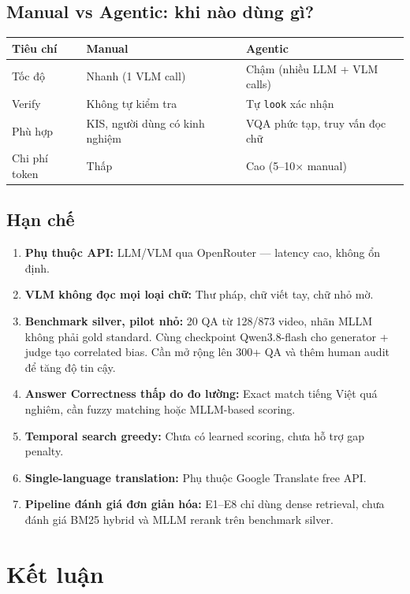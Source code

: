 \documentclass[12pt,a4paper,onecolumn]{article}
\begin{document}
\subsection{Manual vs Agentic: khi nào dùng gì?}

\begin{center}
\begin{tabular}{l l l}
\toprule
Tiêu chí & Manual & Agentic \\
\midrule
Tốc độ & Nhanh (1 VLM call) & Chậm (nhiều LLM + VLM calls) \\
Verify & Không tự kiểm tra & Tự \texttt{look} xác nhận \\
Phù hợp & KIS, người dùng có kinh nghiệm & VQA phức tạp, truy vấn đọc chữ \\
Chi phí token & Thấp & Cao (5–10× manual) \\
\bottomrule
\end{tabular}
\end{center}


\subsection{Hạn chế}

\begin{enumerate}
  \item \textbf{Phụ thuộc API:} LLM/VLM qua OpenRouter — latency cao, không ổn định.
  \item \textbf{VLM không đọc mọi loại chữ:} Thư pháp, chữ viết tay, chữ nhỏ mờ.
  \item \textbf{Benchmark silver, pilot nhỏ:} 20 QA từ 128/873 video, nhãn MLLM không phải gold standard. Cùng checkpoint Qwen3.8-flash cho generator + judge tạo correlated bias. Cần mở rộng lên 300+ QA và thêm human audit để tăng độ tin cậy.
  \item \textbf{Answer Correctness thấp do đo lường:} Exact match tiếng Việt quá nghiêm, cần fuzzy matching hoặc MLLM-based scoring.
  \item \textbf{Temporal search greedy:} Chưa có learned scoring, chưa hỗ trợ gap penalty.
  \item \textbf{Single-language translation:} Phụ thuộc Google Translate free API.
  \item \textbf{Pipeline đánh giá đơn giản hóa:} E1–E8 chỉ dùng dense retrieval, chưa đánh giá BM25 hybrid và MLLM rerank trên benchmark silver.
\end{enumerate}


\section{Kết luận}
\end{document}
